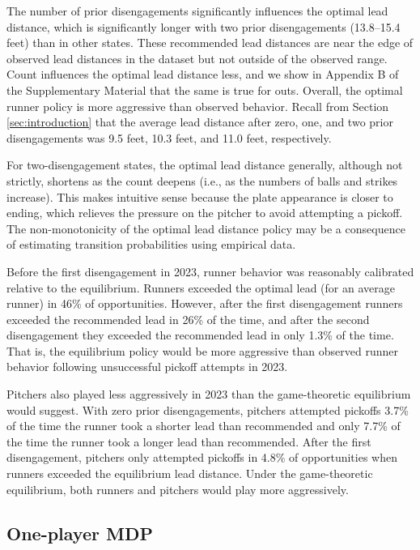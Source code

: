 \documentclass[aoas]{imsart}
\begin{document}
      The number of prior disengagements significantly influences the optimal lead distance, which is significantly longer with two prior disengagements (13.8--15.4 feet) than in other states. These recommended lead distances are near the edge of observed lead distances in the dataset but not outside of the observed range. Count influences the optimal lead distance less, and we show in Appendix B of the Supplementary Material that the same is true for outs. Overall, the optimal runner policy is more aggressive than observed behavior. Recall from Section \ref{sec:introduction} that the average lead distance after zero, one, and two prior disengagements was 9.5 feet, 10.3 feet, and 11.0 feet, respectively.

      For two-disengagement states, the optimal lead distance generally, although not strictly, shortens as the count deepens (i.e., as the numbers of balls and strikes increase). This makes intuitive sense because the plate appearance is closer to ending, which relieves the pressure on the pitcher to avoid attempting a pickoff. The non-monotonicity of the optimal lead distance policy may be a consequence of estimating transition probabilities using empirical data.
      
      Before the first disengagement in 2023, runner behavior was reasonably calibrated relative to the equilibrium. Runners exceeded the optimal lead (for an average runner) in 46\% of opportunities. However, after the first disengagement runners exceeded the recommended lead in 26\% of the time, and after the second disengagement they exceeded the recommended lead in only 1.3\% of the time. That is, the equilibrium policy would be more aggressive than observed runner behavior following unsuccessful pickoff attempts in 2023.

      Pitchers also played less aggressively in 2023 than the game-theoretic equilibrium would suggest. With zero prior disengagements, pitchers attempted pickoffs 3.7\% of the time the runner took a shorter lead than recommended and only 7.7\% of the time the runner took a longer lead than recommended. After the first disengagement, pitchers only attempted pickoffs in 4.8\% of opportunities when runners exceeded the equilibrium lead distance. Under the game-theoretic equilibrium, both runners and pitchers would play more aggressively.

    \subsection{One-player MDP}
    \label{sec:results-one-player}
\end{document}
